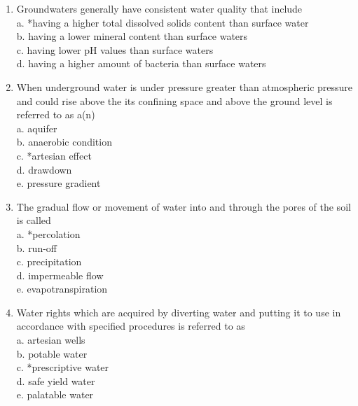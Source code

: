 \begin{enumerate}









  \item Groundwaters generally have consistent water quality that include\\
a. *having a higher total dissolved solids content than surface water\\
b. having a lower mineral content than surface waters\\
c. having lower $\mathrm{pH}$ values than surface waters\\
d. having a higher amount of bacteria than surface waters\\

\item When underground water is under pressure greater than atmospheric pressure and could rise above the its confining space and above the ground level is referred to as a(n)\\
a. aquifer\\
b. anaerobic condition\\
c. *artesian effect\\
d. drawdown\\
e. pressure gradient\\
  \item The gradual flow or movement of water into and through the pores of the soil is called\\
a. *percolation\\
b. run-off\\
c. precipitation\\
d. impermeable flow\\
e. evapotranspiration\\

  \item Water rights which are acquired by diverting water and putting it to use in accordance with specified procedures is referred to as\\
a. artesian wells\\
b. potable water\\
c. *prescriptive water\\
d. safe yield water\\
e. palatable water\\


\end{enumerate}
